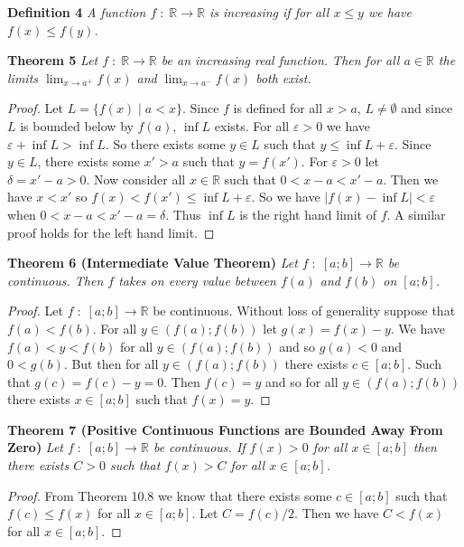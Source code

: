 \documentclass{article}
\begin{document}
\begin{flushleft}
\textbf{Definition 4}
\textsl{A function $f \; : \; \mathbb{R} \rightarrow \mathbb{R}$ is increasing if for all $x \leq y$ we have $f(x) \leq f(y)$.}\newline

\textbf{Theorem 5}
\textsl{Let $f \; : \; \mathbb{R} \rightarrow \mathbb{R}$ be an increasing real function. Then for all $a \in \mathbb{R}$ the limits $\lim_{x \rightarrow a^+} f(x)$ and $\lim_{x \rightarrow a^-} f(x)$ both exist.}
\begin{proof}
Let $L= \{f(x) \mid a < x\}$. Since $f$ is defined for all $x>a$, $L \neq \emptyset$ and since $L$ is bounded below by $f(a)$, $\inf L$ exists. For all $\varepsilon > 0$ we have $\varepsilon + \inf L > \inf L$. So there exists some $y \in L$ such that $y \leq \inf L + \varepsilon$. Since $y \in L$, there exists some $x' > a$ such that $y = f(x')$. For $\varepsilon > 0$ let $\delta = x' - a > 0$. Now consider all $x \in \mathbb{R}$ such that $0 < x-a < x' -a$. Then we have $x<x'$ so $f(x) < f(x') \leq \inf L + \varepsilon$. So we have $|f(x) - \inf L| < \varepsilon$ when $0 < x-a < x'-a = \delta$. Thus $\inf L$ is the right hand limit of $f$. A similar proof holds for the left hand limit.
\end{proof}

\textbf{Theorem 6 (Intermediate Value Theorem)}
\textsl{Let $f \; : \; [a;b] \rightarrow \mathbb{R}$ be continuous. Then $f$ takes on every value between $f(a)$ and $f(b)$ on $[a;b]$.}
\begin{proof}
Let $f \; : \; [a;b] \rightarrow \mathbb{R}$ be continuous. Without loss of generality suppose that $f(a)<f(b)$. For all $y \in (f(a);f(b))$ let $g(x)=f(x)-y$. We have $f(a) < y < f(b)$ for all $y \in (f(a);f(b))$ and so $g(a) < 0$ and $0 < g(b)$. But then for all $y \in (f(a);f(b))$ there exists $c \in [a;b]$. Such that $g(c)=f(c)-y=0$. Then $f(c)=y$ and so for all $y \in (f(a);f(b))$ there exists $x \in [a;b]$ such that $f(x)=y$.
\end{proof}

\textbf{Theorem 7 (Positive Continuous Functions are Bounded Away From Zero)}
\textsl{Let $f \; : \; [a;b] \rightarrow \mathbb{R}$ be continuous. If $f(x) > 0$ for all $x \in [a;b]$  then there exists $C > 0$ such that $f(x) > C$ for all $x \in [a;b]$.}
\begin{proof}
From Theorem 10.8 we know that there exists some $c \in [a;b]$ such that $f(c) \leq f(x)$ for all $x \in [a;b]$. Let $C = f(c)/2$. Then we have $C < f(x)$ for all $x \in [a;b]$.
\end{proof}


\end{flushleft}
\end{document}
